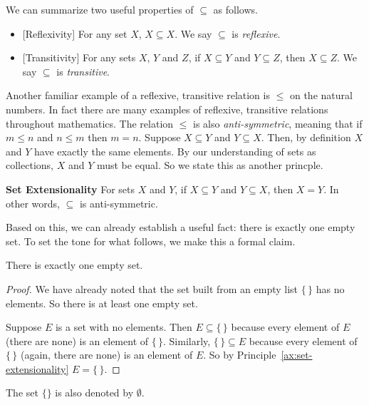 We can summarize two useful properties of $\subseteq$ as follows.
\begin{itemize}
	\item{}[Reflexivity]  For any set $X$, $X \subseteq X$. We say $\subseteq$ is \emph{reflexive}.
	\item{}[Transitivity] For any sets $X$, $Y$ and $Z$,
	if $X\subseteq Y$ and $Y\subseteq Z$, then $X\subseteq Z$. We say $\subseteq$ is \emph{transitive}.
\end{itemize}
Another familiar example of a reflexive, transitive
relation is $\leq$ on the natural numbers. In fact there are many examples of reflexive, transitive relations throughout mathematics. 
The relation $\leq$ is also \emph{anti-symmetric}, meaning that if $m\leq n$ and $n\leq m$ then $m=n$. 
Suppose $X\subseteq Y$ and $Y\subseteq X$. Then, by definition $X$ and $Y$ have exactly the same elements.  By our understanding of sets as collections,
$X$ and $Y$ must be equal. So we state this as another princple.

\begin{principle}\label{ax:set-extensionality}
\noindent \textbf{Set Extensionality}
For sets $X$ and $Y$, if $X\subseteq Y$ and $Y\subseteq X$, then $X=Y$. In other words, $\subseteq$ is anti-symmetric.
\end{principle}

Based on this, we can already establish a useful fact: there is exactly one empty set. To set the tone for what follows, we make this a formal claim.

\begin{lemma}
	There is exactly one empty set.
\begin{proof}
	We have already noted that the set built from an empty list $\{\,\}$ has no elements. So there is at least one empty set.
	
	Suppose $E$ is a set with no elements.
	Then $E\subseteq \{\,\}$ because every element of $E$ (there are none) is an element of $\{\,\}$. 
	Similarly, $\{\,\}\subseteq E$ because every element of $\{\,\}$ (again, there are none) is an element of $E$. 
	So by Principle~\ref{ax:set-extensionality} $E = \{\,\}$.
\end{proof}
\end{lemma}

\begin{defn}
  The set $\{\}$ is also denoted by $\emptyset$.
\end{defn}

